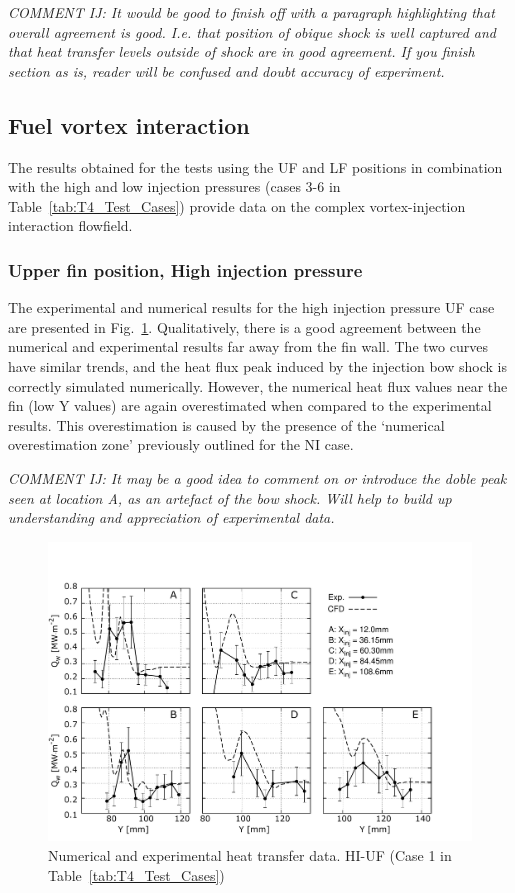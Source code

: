 \documentclass{AIAA}
\begin{document}
{\it COMMENT IJ: It would be good to finish off with a paragraph highlighting that overall agreement is good. I.e. that position of obique shock is well captured and that heat transfer levels outside of shock are in good agreement. If you finish section as is, reader will be confused and doubt accuracy of experiment.}


\subsection{Fuel vortex interaction}

The results obtained for the tests using the UF and LF positions in combination with the high and low injection pressures (cases 3-6 in Table~\ref{tab:T4_Test_Cases}) provide data on the complex vortex-injection interaction flowfield.

\subsubsection{Upper fin position, High injection pressure}

The experimental and numerical results for the high injection pressure UF case are presented in Fig.~\ref{fig:HeatFluxLPHIUF}.
Qualitatively, there is a good agreement between the numerical and experimental results far away from the fin wall.
The two curves have similar trends, and the heat flux peak induced by the injection bow shock is correctly simulated numerically.
However, the numerical heat flux values near the fin (low Y values) are again overestimated when compared to the experimental results.
This overestimation is caused by the presence of the `numerical overestimation zone' previously outlined for the NI case.


{\it COMMENT IJ: It may be a good idea to comment on or introduce the doble peak seen at location A, as an artefact of the bow shock. Will help to build up understanding and appreciation of experimental data.}

%
\begin{figure}[!h]
\center
\includegraphics[trim = 0mm 3mm 25mm 25mm, clip, width=0.60\columnwidth,valign=t,fbox]{Figures/Data/LP_HI_UF/GNUP_CFD_GaugesLines_Multi.pdf}
\caption{Numerical and experimental heat transfer data. HI-UF (Case 1 in Table~\ref{tab:T4_Test_Cases})}
\label{fig:HeatFluxLPHIUF}
\end{figure} 
\end{document}
